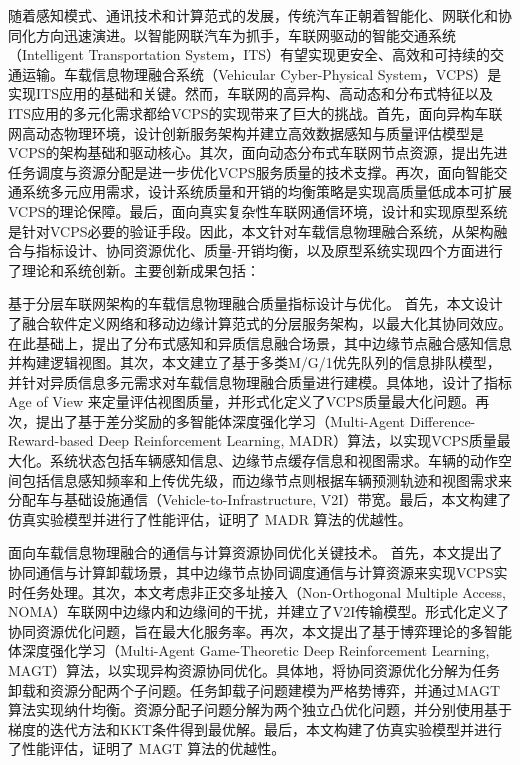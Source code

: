 \begin{cabstract}	%

随着感知模式、通讯技术和计算范式的发展，传统汽车正朝着智能化、网联化和协同化方向迅速演进。以智能网联汽车为抓手，车联网驱动的智能交通系统（Intelligent Transportation System，ITS）有望实现更安全、高效和可持续的交通运输。车载信息物理融合系统（Vehicular Cyber-Physical System，VCPS）是实现ITS应用的基础和关键。然而，车联网的高异构、高动态和分布式特征以及ITS应用的多元化需求都给VCPS的实现带来了巨大的挑战。首先，面向异构车联网高动态物理环境，设计创新服务架构并建立高效数据感知与质量评估模型是VCPS的架构基础和驱动核心。其次，面向动态分布式车联网节点资源，提出先进任务调度与资源分配是进一步优化VCPS服务质量的技术支撑。再次，面向智能交通系统多元应用需求，设计系统质量和开销的均衡策略是实现高质量低成本可扩展VCPS的理论保障。最后，面向真实复杂性车联网通信环境，设计和实现原型系统是针对VCPS必要的验证手段。因此，本文针对车载信息物理融合系统，从架构融合与指标设计、协同资源优化、质量-开销均衡，以及原型系统实现四个方面进行了理论和系统创新。主要创新成果包括：

 基于分层车联网架构的车载信息物理融合质量指标设计与优化。
首先，本文设计了融合软件定义网络和移动边缘计算范式的分层服务架构，以最大化其协同效应。 在此基础上，提出了分布式感知和异质信息融合场景，其中边缘节点融合感知信息并构建逻辑视图。其次，本文建立了基于多类M/G/1优先队列的信息排队模型，并针对异质信息多元需求对车载信息物理融合质量进行建模。具体地，设计了指标 Age of View 来定量评估视图质量，并形式化定义了VCPS质量最大化问题。再次，提出了基于差分奖励的多智能体深度强化学习（Multi-Agent Difference-Reward-based Deep Reinforcement Learning, MADR）算法，以实现VCPS质量最大化。系统状态包括车辆感知信息、边缘节点缓存信息和视图需求。车辆的动作空间包括信息感知频率和上传优先级，而边缘节点则根据车辆预测轨迹和视图需求来分配车与基础设施通信（Vehicle-to-Infrastructure, V2I）带宽。最后，本文构建了仿真实验模型并进行了性能评估，证明了 MADR 算法的优越性。

 面向车载信息物理融合的通信与计算资源协同优化关键技术。
首先，本文提出了协同通信与计算卸载场景，其中边缘节点协同调度通信与计算资源来实现VCPS实时任务处理。其次，本文考虑非正交多址接入（Non-Orthogonal Multiple Access, NOMA）车联网中边缘内和边缘间的干扰，并建立了V2I传输模型。形式化定义了协同资源优化问题，旨在最大化服务率。再次，本文提出了基于博弈理论的多智能体深度强化学习（Multi-Agent Game-Theoretic Deep Reinforcement Learning, MAGT）算法，以实现异构资源协同优化。具体地，将协同资源优化分解为任务卸载和资源分配两个子问题。任务卸载子问题建模为严格势博弈，并通过MAGT算法实现纳什均衡。资源分配子问题分解为两个独立凸优化问题，并分别使用基于梯度的迭代方法和KKT条件得到最优解。最后，本文构建了仿真实验模型并进行了性能评估，证明了 MAGT 算法的优越性。


\end{cabstract}

